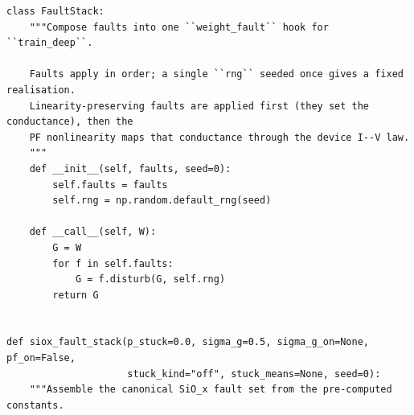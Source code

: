 \begin{lstlisting}[caption={mrl\_trace/device\_faults.py},label={lst:siox-src-device_faults}]
class FaultStack:
    """Compose faults into one ``weight_fault`` hook for ``train_deep``.

    Faults apply in order; a single ``rng`` seeded once gives a fixed realisation.
    Linearity-preserving faults are applied first (they set the conductance), then the
    PF nonlinearity maps that conductance through the device I--V law.
    """
    def __init__(self, faults, seed=0):
        self.faults = faults
        self.rng = np.random.default_rng(seed)

    def __call__(self, W):
        G = W
        for f in self.faults:
            G = f.disturb(G, self.rng)
        return G


def siox_fault_stack(p_stuck=0.0, sigma_g=0.5, sigma_g_on=None, pf_on=False,
                     stuck_kind="off", stuck_means=None, seed=0):
    """Assemble the canonical SiO_x fault set from the pre-computed constants.


\end{lstlisting}
